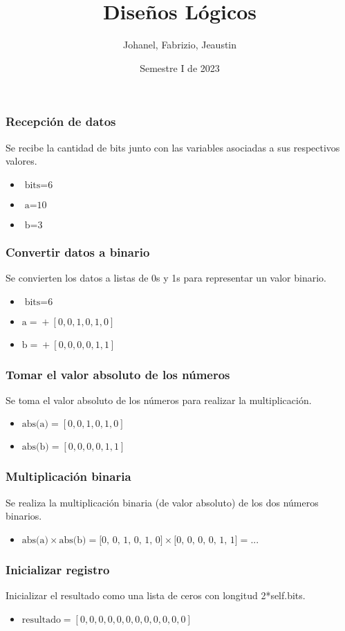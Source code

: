 \documentclass{beamer}
\title{Diseños Lógicos}
\author{Johanel, Fabrizio, Jeaustin}
\institute{Tecnológico de Costa Rica}
\date{Semestre I de 2023}
\begin{document}
\begin{frame}
\frametitle{Recepción de datos}
Se recibe la cantidad de bits junto con las variables asociadas a sus respectivos valores.
\begin{itemize}
\item $\text{bits} = \text{6}$
\item $\text{a} = \text{10}$
\item $\text{b} = \text{3}$
\end{itemize}
\end{frame}
\begin{frame}
\frametitle{Convertir datos a binario}
Se convierten los datos a listas de 0s y 1s para representar un valor binario.
\begin{itemize}
\item $\text{bits} = \text{6}$
\item $\text{a} = \text{} + [0, 0, 1, 0, 1, 0]$
\item $\text{b} = \text{} + [0, 0, 0, 0, 1, 1]$
\end{itemize}
\end{frame}
\begin{frame}
\frametitle{Tomar el valor absoluto de los números}
Se toma el valor absoluto de los números para realizar la multiplicación.
\begin{itemize}
\item $\text{abs(a)} = [0, 0, 1, 0, 1, 0]$
\item $\text{abs(b)} = [0, 0, 0, 0, 1, 1]$
\end{itemize}
\end{frame}
\begin{frame}
\frametitle{Multiplicación binaria}
Se realiza la multiplicación binaria (de valor absoluto) de los dos números binarios.
\begin{itemize}
\item $\text{abs(a)} \times \text{abs(b)} = \text{[0, 0, 1, 0, 1, 0]} \times \text{[0, 0, 0, 0, 1, 1]} = \text{...}$
\end{itemize}
\end{frame}
\begin{frame}
\frametitle{Inicializar registro}
Inicializar el resultado como una lista de ceros con longitud 2*self.bits.
\begin{itemize}
\item $\text{resultado} = [0, 0, 0, 0, 0, 0, 0, 0, 0, 0, 0, 0]$
\end{itemize}
\end{frame}
\end{document}
